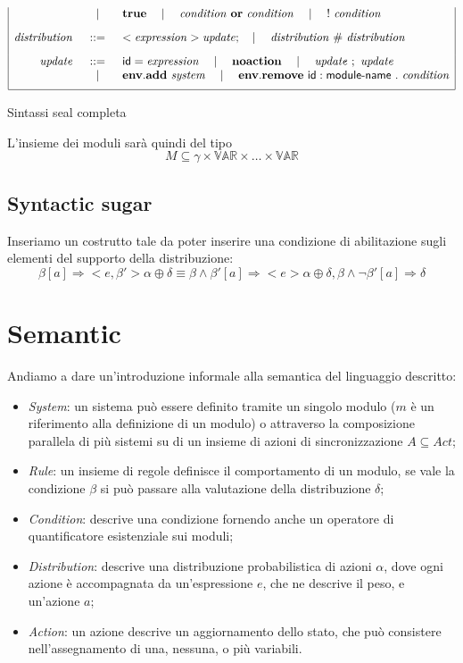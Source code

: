 \begin{table}
$$\begin{array}{|rcl|}
	& \quad\mid\quad & \mathbf{true} \quad\mid\quad \mathit{condition} \mbox{ } \mathbf{or} \mbox{ } \mathit{condition} \quad\mid\quad {\sf !} \mbox{ } \mathit{condition}
	\\[.3cm]
\mathit{distribution} &::=& <\mathit{expression}> \mathit{update}; \quad\mid\quad \mathit{distribution} \mbox{ } \# \mbox{ } \mathit{distribution}
	\\[.3cm]
\mathit{update} &::=& {\sf id} = \mathit{expression} \quad\mid\quad \mathbf{noaction} \quad\mid\quad \mathit{update} \mbox{ } ; \mbox{ } \mathit{update} \\
	& \quad\mid\quad & \mathbf{env.add} \mbox{ } \mathit{system} \quad\mid\quad \mathbf{env.remove} \mbox{ } {\sf id}:{\sf module}\textrm{-}{\sf name} \mbox{ } . \mbox{ } \mathit{condition} 
	\\[.2cm]
\hline
\end{array}
$$
\label{tab:sealsyntax}
\caption{Sintassi \ac{seal} completa}
\end{table}

L'insieme dei moduli sarà quindi del tipo
$$ M \subseteq \gamma \times \mathbb{VAR} \times \dots \times \mathbb{VAR} $$

\subsection{Syntactic sugar}
Inseriamo un costrutto tale da poter inserire una condizione di abilitazione sugli elementi del supporto della distribuzione:
$$
\beta [a]\Rightarrow <e,\beta'> \alpha \oplus \delta
\equiv 
\beta \wedge \beta' [a]\Rightarrow <e> \alpha \oplus \delta,
\beta \wedge \neg\beta' [a]\Rightarrow \delta
$$

\section{Semantic}
Andiamo a dare un'introduzione informale alla semantica del linguaggio descritto:
\begin{itemize}
	\item \emph{System}: un sistema può essere definito tramite un singolo modulo ($m$ è un riferimento alla definizione di un modulo) o attraverso la composizione parallela di più sistemi su di un insieme di azioni di sincronizzazione $A \subseteq Act$;
	\item \emph{Rule}: un insieme di regole definisce il comportamento di un modulo, se vale la condizione $\beta$ si può passare alla valutazione della distribuzione $\delta$;
	\item \emph{Condition}: descrive una condizione fornendo anche un operatore di quantificatore esistenziale sui moduli;
	\item \emph{Distribution}: descrive una distribuzione probabilistica di azioni $\alpha$, dove ogni azione è accompagnata da un'espressione $e$, che ne descrive il peso, e un'azione $a$;
	\item \emph{Action}: un azione descrive un aggiornamento dello stato, che può consistere nell'assegnamento di una, nessuna, o più variabili.
\end{itemize}

